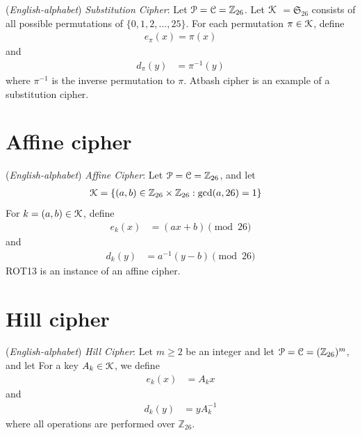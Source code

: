 \documentclass[a4paper, 12pt]{book} %
\begin{document}
\begin{example}
    (\emph{English-alphabet}) \emph{Substitution Cipher}: Let $\EuScript{P} = \EuScript{C} = \mathbb{Z}_{26}$. Let $\EuScript{K}$ $= \mathfrak{S}_{26}$ consists of all possible permutations of $\{0,1,2,\ldots, 25\}$. For each permutation $\pi \in \EuScript{K}$, define
    \begin{align}
        e_\pi(x) = \pi(x)
    \end{align}
    and 
    \begin{align}
        d_\pi(y) &= \pi^{-1}(y)
    \end{align}
    where $\pi^{-1}$ is the inverse permutation to $\pi$. \textsf{Atbash cipher} is an example of a substitution cipher. 
\end{example}






\section{Affine cipher}

\begin{example}
    (\emph{English-alphabet}) \emph{Affine Cipher}: Let $\EuScript{P} = \EuScript{C} = \mathbb{Z}_{26}$, and let 
    \begin{align}
        \EuScript{K} &= \{(a, b) \in \mathbb{Z}_{26} \times \mathbb{Z}_{26}: \gcd(a, 26) = 1\}
    \end{align}
    For $k = (a, b) \in \EuScript{K}$, define 
    \begin{align}
        e_k(x) &= (ax + b) \pmod{26} 
    \end{align}
    and 
    \begin{align}
        d_k(y) &= a^{-1}(y - b) \pmod{26}
    \end{align}
    \textsf{ROT13} is an instance of an affine cipher.
\end{example}


\section{Hill cipher}
\begin{example}
        (\emph{English-alphabet}) \emph{Hill Cipher}: Let $m \geq 2$ be an integer and let $\EuScript{P} = \EuScript{C} = (\mathbb{Z}_{26})^m$, and let 
    For a key $A_k \in \EuScript{K}$, we define 
    \begin{align}
        e_k(x) &= A_k x
    \end{align}
    and 
    \begin{align}
        d_k(y) &= y A_k^{-1}
    \end{align}
    where all operations are performed over $\mathbb{Z}_{26}$.
\end{example}
\end{document}
